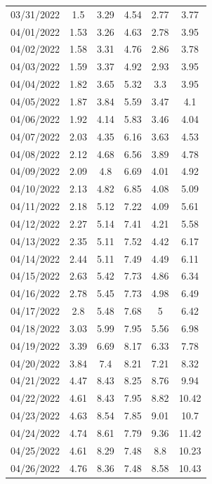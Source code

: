 \documentclass[withoutpreface,bwprint]{cumcmthesis} %
\begin{document}
\begin{appendices}
\begin{table}[]
\begin{tabular}{cccccc}
03/31/2022 & 1.5   & 3.29     & 4.54      & 2.77   & 3.77          \\
04/01/2022 & 1.53  & 3.26     & 4.63      & 2.78   & 3.95          \\
04/02/2022 & 1.58  & 3.31     & 4.76      & 2.86   & 3.78          \\
04/03/2022 & 1.59  & 3.37     & 4.92      & 2.93   & 3.95          \\
04/04/2022 & 1.82  & 3.65     & 5.32      & 3.3    & 3.95          \\
04/05/2022 & 1.87  & 3.84     & 5.59      & 3.47   & 4.1           \\
04/06/2022 & 1.92  & 4.14     & 5.83      & 3.46   & 4.04          \\
04/07/2022 & 2.03  & 4.35     & 6.16      & 3.63   & 4.53          \\
04/08/2022 & 2.12  & 4.68     & 6.56      & 3.89   & 4.78          \\
04/09/2022 & 2.09  & 4.8      & 6.69      & 4.01   & 4.92          \\
04/10/2022 & 2.13  & 4.82     & 6.85      & 4.08   & 5.09          \\
04/11/2022 & 2.18  & 5.12     & 7.22      & 4.09   & 5.61          \\
04/12/2022 & 2.27  & 5.14     & 7.41      & 4.21   & 5.58          \\
04/13/2022 & 2.35  & 5.11     & 7.52      & 4.42   & 6.17          \\
04/14/2022 & 2.44  & 5.11     & 7.49      & 4.49   & 6.11          \\
04/15/2022 & 2.63  & 5.42     & 7.73      & 4.86   & 6.34          \\
04/16/2022 & 2.78  & 5.45     & 7.73      & 4.98   & 6.49          \\
04/17/2022 & 2.8   & 5.48     & 7.68      & 5      & 6.42          \\
04/18/2022 & 3.03  & 5.99     & 7.95      & 5.56   & 6.98          \\
04/19/2022 & 3.39  & 6.69     & 8.17      & 6.33   & 7.78          \\
04/20/2022 & 3.84  & 7.4      & 8.21      & 7.21   & 8.32          \\
04/21/2022 & 4.47  & 8.43     & 8.25      & 8.76   & 9.94          \\
04/22/2022 & 4.61  & 8.43     & 7.95      & 8.82   & 10.42         \\
04/23/2022 & 4.63  & 8.54     & 7.85      & 9.01   & 10.7          \\
04/24/2022 & 4.74  & 8.61     & 7.79      & 9.36   & 11.42         \\
04/25/2022 & 4.61  & 8.29     & 7.48      & 8.8    & 10.23         \\
04/26/2022 & 4.76  & 8.36     & 7.48      & 8.58   & 10.43        
\end{tabular}
\end{table}

\end{appendices}
\end{document}

